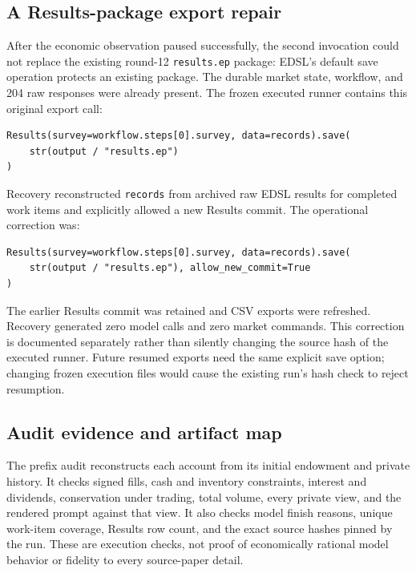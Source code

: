 \documentclass[11pt,letterpaper]{article}
\newcommand{\code}[1]{\texttt{\small #1}}
\begin{document}
\subsection{A Results-package export repair}
After the economic observation paused successfully, the second invocation
could not replace the existing round-12 \code{results.ep} package: EDSL's
default save operation protects an existing package. The durable market state,
workflow, and 204 raw responses were already present. The frozen executed
runner contains this original export call:
\begin{lstlisting}[numbers=none]
Results(survey=workflow.steps[0].survey, data=records).save(
    str(output / "results.ep")
)
\end{lstlisting}
Recovery reconstructed \code{records} from archived raw EDSL results for
completed work items and explicitly allowed a new Results commit. The
operational correction was:
\begin{lstlisting}[numbers=none]
Results(survey=workflow.steps[0].survey, data=records).save(
    str(output / "results.ep"), allow_new_commit=True
)
\end{lstlisting}
The earlier Results commit was retained and CSV exports were refreshed.
Recovery generated zero model calls and zero market commands. This correction
is documented separately rather than silently changing the source hash of the
executed runner. Future resumed exports need the same explicit save option;
changing frozen execution files would cause the existing run's hash check to
reject resumption.

\subsection{Audit evidence and artifact map}
The prefix audit reconstructs each account from its initial endowment and
private history. It checks signed fills, cash and inventory constraints,
interest and dividends, conservation under trading, total volume, every
private view, and the rendered prompt against that view. It also checks model
finish reasons, unique work-item coverage, Results row count, and the exact
source hashes pinned by the run. These are execution checks, not proof of
economically rational model behavior or fidelity to every source-paper detail.
\end{document}
